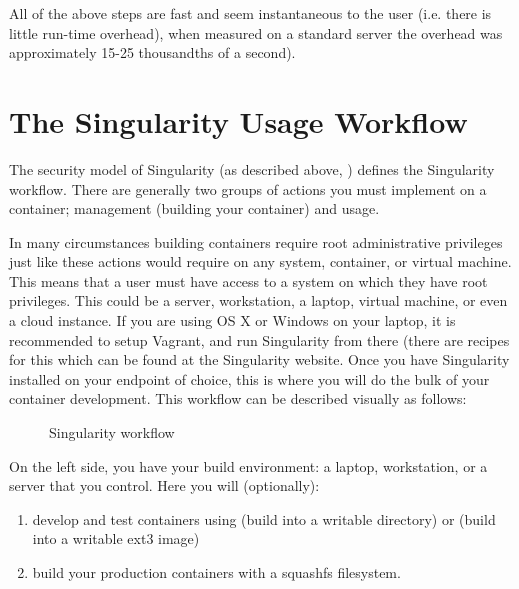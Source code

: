 \documentclass[letterpaper,10pt,english]{sphinxmanual}
\begin{document}
All of the above steps are fast and seem instantaneous to the user (i.e. there is little run-time overhead), when measured on a standard server the overhead was approximately 15-25 thousandths of a second).


\section{The Singularity Usage Workflow}
\label{\detokenize{introduction:the-singularity-usage-workflow}}
The security model of Singularity (as described above, {\hyperref[\detokenize{introduction:security-and-privilege-escalation}]{}}) defines the
Singularity workflow. There are generally two groups of actions you
must implement on a container; management (building your container)
and usage.

In many circumstances building containers require root administrative
privileges just like these actions would require on any system,
container, or virtual machine. This means that a user must have access
to a system on which they have root privileges. This could be a
server, workstation, a laptop, virtual machine, or even a cloud
instance. If you are using OS X or Windows on your laptop, it is
recommended to setup Vagrant, and run Singularity from there (there
are recipes for this which can be found at the Singularity website.
Once you have Singularity installed on your endpoint of choice, this
is where you will do the bulk of your container development. This
workflow can be described visually as follows:

\begin{figure}[htbp]
\centering
\capstart

\noindent{}
\caption{Singularity workflow}\label{\detokenize{introduction:id4}}\end{figure}

On the left side, you have your build environment: a laptop,
workstation, or a server that you control. Here you will (optionally):
\begin{enumerate}
\item {} 
develop and test containers using  (build into a writable directory)
or  (build into a writable ext3 image)

\item {} 
build your production containers with a squashfs filesystem.

\end{enumerate}
\end{document}
